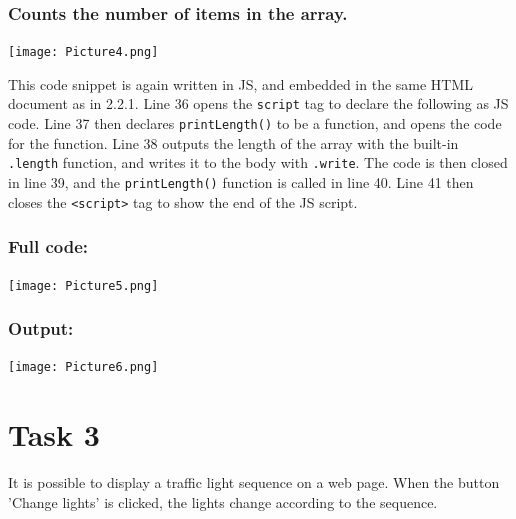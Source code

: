 \documentclass[a4paper]{article}
\begin{document}
\subsubsection{Counts the number of items in the array.}
\noindent\texttt{[image: Picture4.png]} \par
This code snippet is again written in JS, and embedded in the same HTML document as in 2.2.1. Line 36 opens the \verb|script| tag to declare the following as JS code. Line 37 then declares \verb|printLength()| to be a function, and opens the code for the function. Line 38 outputs the length of the array with the built-in \verb|.length| function, and writes it to the body with \verb|.write|.  The code is then closed in line 39, and the \verb|printLength()| function is called in line 40. Line 41 then closes the \verb|<script>| tag to show the end of the JS script.
\subsubsection{Full code:}
\noindent\texttt{[image: Picture5.png]} \par \newpage
\subsubsection{Output:}
\noindent\texttt{[image: Picture6.png]} \par \newpage
\section{Task 3}
It is possible to display a traffic light sequence on a web page. When the button 'Change lights' is
clicked, the lights change according to the sequence.
\end{document}
